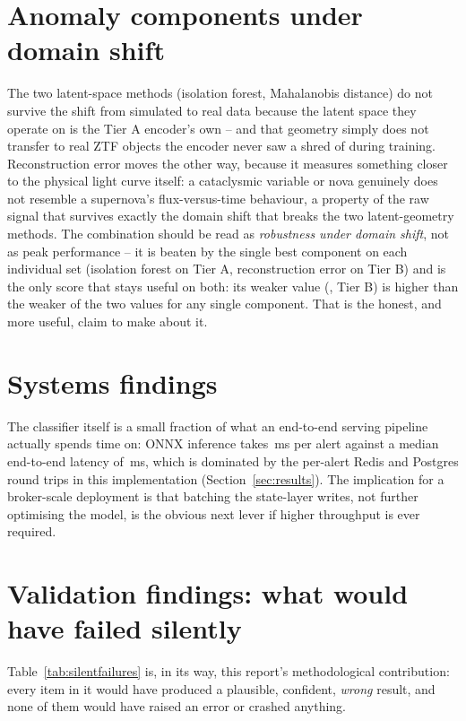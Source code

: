 \section{Anomaly components under domain shift}

The two latent-space methods (isolation forest, Mahalanobis distance) do
not survive the shift from simulated to real data because the latent space
they operate on is the Tier A encoder's own -- and that geometry simply
does not transfer to real ZTF objects the encoder never saw a shred of
during training. Reconstruction error moves the other way, because it
measures something closer to the physical light curve itself: a
cataclysmic variable or nova genuinely does not resemble a supernova's
flux-versus-time behaviour, a property of the raw signal that survives
exactly the domain shift that breaks the two latent-geometry methods. The
combination should be read as \emph{robustness under domain shift}, not as
peak performance -- it is beaten by the single best component on each
individual set (isolation forest on Tier A, reconstruction error on Tier B)
and is the only score that stays useful on both: its weaker value
(\AnomalyTierBCombinedThreeRecomputed{}, Tier B) is higher than the weaker of
the two values for any single component.
That is the honest, and more useful, claim to make about it.

\section{Systems findings}

The classifier itself is a small fraction of what an end-to-end serving
pipeline actually spends time on: ONNX inference takes
\OnnxMsPerAlertBatchOne{}\,ms per alert against a median end-to-end latency
of \ServingLatencyPFifty{}\,ms, which is dominated by the per-alert Redis
and Postgres round trips in this implementation
(Section~\ref{sec:results}). The implication for a broker-scale deployment is that
batching the state-layer writes, not further optimising the model, is the
obvious next lever if higher throughput is ever required.

\section{Validation findings: what would have failed silently}
\label{sec:silentfailures}

Table~\ref{tab:silentfailures} is, in its way, this report's methodological
contribution: every item in it would have produced a plausible, confident,
\emph{wrong} result, and none of them would have raised an error or crashed
anything.

